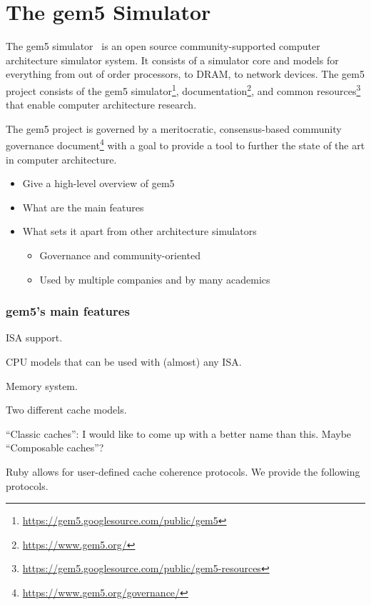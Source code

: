 

\section{The gem5 Simulator}

The gem5 simulator~\cite{Binkert-gem5-2011} is an open source community-supported computer architecture simulator system.
It consists of a simulator core and models for everything from out of order processors, to DRAM, to network devices.
The gem5 project consists of the gem5 simulator\footnote{\url{https://gem5.googlesource.com/public/gem5}}, documentation\footnote{\url{https://www.gem5.org/}}, and common resources\footnote{\url{https://gem5.googlesource.com/public/gem5-resources}} that enable computer architecture research.

The gem5 project is governed by a meritocratic, consensus-based community governance document\footnote{\url{https://www.gem5.org/governance/}} with a goal to provide a tool to further the state of the art in computer architecture.


\begin{itemize}
    \item Give a high-level overview of gem5
    \item What are the main features
    \item What sets it apart from other architecture simulators
    \begin{itemize}
        \item Governance and community-oriented
        \item Used by multiple companies and by many academics
    \end{itemize}
\end{itemize}

\subsubsection{gem5's main features}

ISA support.

CPU models that can be used with (almost) any ISA.

Memory system.

Two different cache models.

``Classic caches'': I would like to come up with a better name than this.
Maybe ``Composable caches''?

Ruby allows for user-defined cache coherence protocols.
We provide the following protocols.

